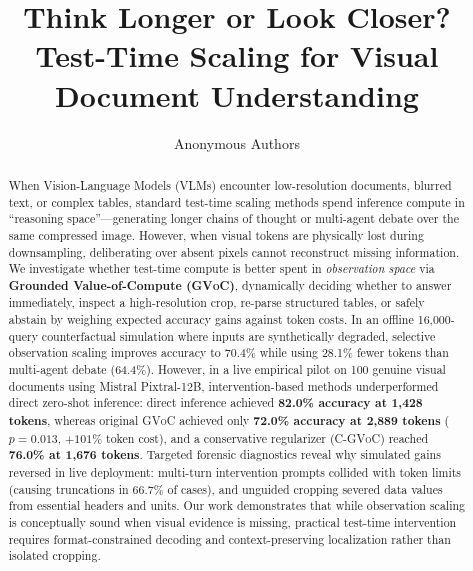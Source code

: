 \documentclass[11pt]{article}
\title{Think Longer or Look Closer? Test-Time Scaling for Visual Document Understanding}
\author{Anonymous Authors}
\begin{document}
\maketitle

\begin{abstract}
When Vision-Language Models (VLMs) encounter low-resolution documents, blurred text, or complex tables, standard test-time scaling methods spend inference compute in ``reasoning space''---generating longer chains of thought or multi-agent debate over the same compressed image. However, when visual tokens are physically lost during downsampling, deliberating over absent pixels cannot reconstruct missing information. We investigate whether test-time compute is better spent in \textit{observation space} via \textbf{Grounded Value-of-Compute (\textsc{GVoC})}, dynamically deciding whether to answer immediately, inspect a high-resolution crop, re-parse structured tables, or safely abstain by weighing expected accuracy gains against token costs. 
In an offline 16,000-query counterfactual simulation where inputs are synthetically degraded, selective observation scaling improves accuracy to 70.4\% while using 28.1\% fewer tokens than multi-agent debate (64.4\%). 
However, in a live empirical pilot on 100 genuine visual documents using Mistral Pixtral-12B, intervention-based methods underperformed direct zero-shot inference: direct inference achieved \textbf{82.0\% accuracy at 1,428 tokens}, whereas original \textsc{GVoC} achieved only \textbf{72.0\% accuracy at 2,889 tokens} ($p = 0.013$, $+101\%$ token cost), and a conservative regularizer (C-\textsc{GVoC}) reached \textbf{76.0\% at 1,676 tokens}.
Targeted forensic diagnostics reveal why simulated gains reversed in live deployment: multi-turn intervention prompts collided with token limits (causing truncations in 66.7\% of cases), and unguided cropping severed data values from essential headers and units. Our work demonstrates that while observation scaling is conceptually sound when visual evidence is missing, practical test-time intervention requires format-constrained decoding and context-preserving localization rather than isolated cropping.
\end{abstract}
\end{document}
